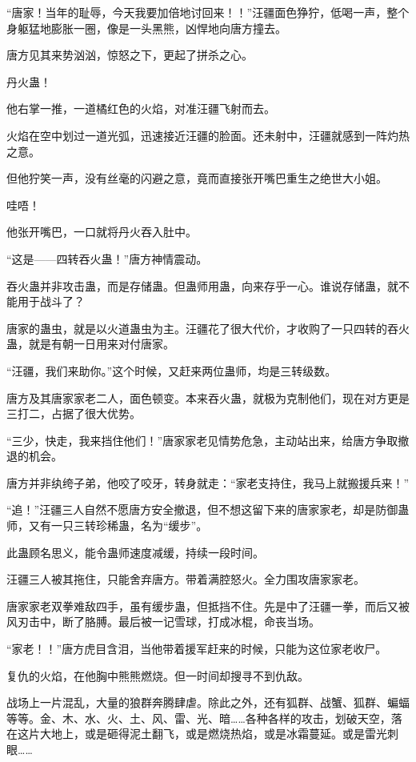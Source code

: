 
\begin{this_body}

“唐家！当年的耻辱，今天我要加倍地讨回来！！”汪疆面色狰狞，低喝一声，整个身躯猛地膨胀一圈，像是一头黑熊，凶悍地向唐方撞去。

唐方见其来势汹汹，惊怒之下，更起了拼杀之心。

丹火蛊！

他右掌一推，一道橘红色的火焰，对准汪疆飞射而去。

火焰在空中划过一道光弧，迅速接近汪疆的脸面。还未射中，汪疆就感到一阵灼热之意。

但他狞笑一声，没有丝毫的闪避之意，竟而直接张开嘴巴重生之绝世大小姐。

哇唔！

他张开嘴巴，一口就将丹火吞入肚中。

“这是——四转吞火蛊！”唐方神情震动。

吞火蛊并非攻击蛊，而是存储蛊。但蛊师用蛊，向来存乎一心。谁说存储蛊，就不能用于战斗了？

唐家的蛊虫，就是以火道蛊虫为主。汪疆花了很大代价，才收购了一只四转的吞火蛊，就是有朝一日用来对付唐家。

“汪疆，我们来助你。”这个时候，又赶来两位蛊师，均是三转级数。

唐方及其唐家家老二人，面色顿变。本来吞火蛊，就极为克制他们，现在对方更是三打二，占据了很大优势。

“三少，快走，我来挡住他们！”唐家家老见情势危急，主动站出来，给唐方争取撤退的机会。

唐方并非纨绔子弟，他咬了咬牙，转身就走：“家老支持住，我马上就搬援兵来！”

“追！”汪疆三人自然不愿唐方安全撤退，但不想这留下来的唐家家老，却是防御蛊师，又有一只三转珍稀蛊，名为“缓步”。

此蛊顾名思义，能令蛊师速度减缓，持续一段时间。

汪疆三人被其拖住，只能舍弃唐方。带着满腔怒火。全力围攻唐家家老。

唐家家老双拳难敌四手，虽有缓步蛊，但抵挡不住。先是中了汪疆一拳，而后又被风刃击中，断了胳膊。最后被一记雪球，打成冰棍，命丧当场。

“家老！！”唐方虎目含泪，当他带着援军赶来的时候，只能为这位家老收尸。

复仇的火焰，在他胸中熊熊燃烧。但一时间却搜寻不到仇敌。

战场上一片混乱，大量的狼群奔腾肆虐。除此之外，还有狐群、战蟹、狐群、蝙蝠等等。金、木、水、火、土、风、雷、光、暗……各种各样的攻击，划破天空，落在这片大地上，或是砸得泥土翻飞，或是燃烧热焰，或是冰霜蔓延。或是雷光刺眼……


\end{this_body}
